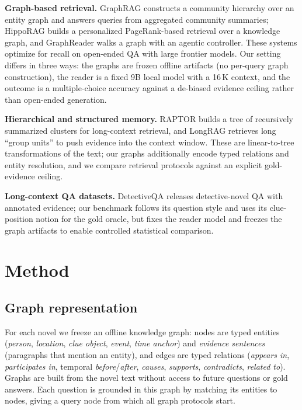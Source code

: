 \documentclass{article}
\begin{document}
\textbf{Graph-based retrieval.} GraphRAG \citep{edge2024graphrag} constructs a
community hierarchy over an entity graph and answers queries from aggregated
community summaries; HippoRAG \citep{gutierrez2024hipporag} builds a
personalized PageRank-based retrieval over a knowledge graph, and GraphReader
\citep{li2024graphreader} walks a graph with an agentic controller. These
systems optimize for recall on open-ended QA with large frontier models. Our
setting differs in three ways: the graphs are frozen offline artifacts (no
per-query graph construction), the reader is a fixed 9B local model with a
16\,K context, and the outcome is a multiple-choice accuracy against a
de-biased evidence ceiling rather than open-ended generation.

\textbf{Hierarchical and structured memory.} RAPTOR \citep{sarthi2024raptor}
builds a tree of recursively summarized clusters for long-context retrieval, and
LongRAG \citep{zhao2024longrag} retrieves long ``group units'' to push evidence
into the context window. These are linear-to-tree transformations of the text;
our graphs additionally encode typed relations and entity resolution, and we
compare retrieval protocols against an explicit gold-evidence ceiling.

\textbf{Long-context QA datasets.} DetectiveQA \citep{xu2024detectiveqa}
releases detective-novel QA with annotated evidence; our benchmark follows its
question style and uses its clue-position notion for the gold oracle, but fixes
the reader model and freezes the graph artifacts to enable controlled
statistical comparison.

\section{Method}
\label{sec:method}

\subsection{Graph representation}
\label{sec:graph}

For each novel we freeze an offline knowledge graph: nodes are typed entities
(\emph{person}, \emph{location}, \emph{clue object}, \emph{event}, \emph{time
anchor}) and \emph{evidence sentences} (paragraphs that mention an entity), and
edges are typed relations (\emph{appears in}, \emph{participates in}, temporal
\emph{before}/\emph{after}, \emph{causes}, \emph{supports}, \emph{contradicts},
\emph{related to}). Graphs are built from the novel text without access to
future questions or gold answers. Each question is grounded in this graph by
matching its entities to nodes, giving a query node from which all graph
protocols start.
\end{document}
